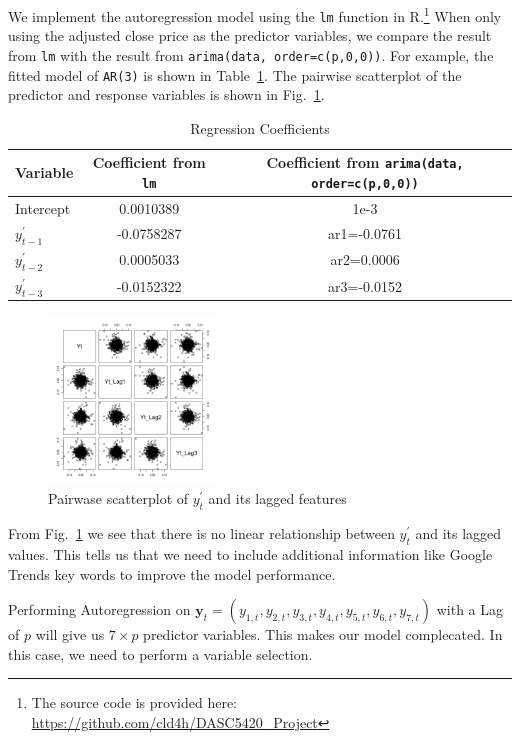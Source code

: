 \documentclass[conference,onecolumn,11pt]{IEEEtran}
\begin{document}
We implement the autoregression model using the \texttt{lm} function in R.\footnote{The source code is provided here: \url{https://github.com/cld4h/DASC5420_Project}} When only using the adjusted close price as the predictor variables, we compare the result from \texttt{lm} with the result from \texttt{arima(data, order=c(p,0,0))}. For example, the fitted model of \texttt{AR(3)} is shown in Table~\ref{tab:regression}. The pairwise scatterplot of the predictor and response variables is shown in Fig.~\ref{fig:pairwise}.

\begin{table}[htbp]
  \centering
  \caption{Regression Coefficients}
  \begin{tabular}{lcc}
    \toprule
    \textbf{Variable} & \textbf{Coefficient from \texttt{lm}} & \textbf{Coefficient from \texttt{arima(data, order=c(p,0,0))}}\\
    \midrule
    Intercept & 0.0010389 & 1e-3\\
    $y^{'}_{t-1}$ & -0.0758287 & ar1=-0.0761\\
    $y^{'}_{t-2}$ & 0.0005033 & ar2=0.0006\\
    $y^{'}_{t-3}$ & -0.0152322 & ar3=-0.0152\\
    \bottomrule
  \end{tabular}
  \label{tab:regression}
\end{table}

\begin{figure}[htpb]
	\centering
	\includegraphics[width=0.4\textwidth]{pic/pairwise.png}
	\caption{Pairwase scatterplot of $y^{'}_t$ and its lagged features}
	\label{fig:pairwise}
\end{figure}

From Fig.~\ref{fig:pairwise} we see that there is no linear relationship between $y^{'}_t$ and its lagged values. This tells us that we need to include additional information like Google Trends key words to improve the model performance.

Performing Autoregression on $\mathbf{y}_t = (y_{1,t},y_{2,t},y_{3,t},y_{4,t},y_{5,t},y_{6,t},y_{7,t})$ with a Lag of $p$ will give us $7\times p$ predictor variables. This makes our model complecated. In this case, we need to perform a variable selection. 
\end{document}
